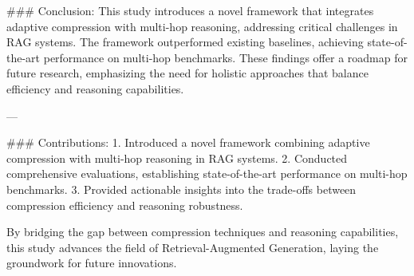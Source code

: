### Conclusion:
This study introduces a novel framework that integrates adaptive compression with multi-hop reasoning, addressing critical challenges in RAG systems. The framework outperformed existing baselines, achieving state-of-the-art performance on multi-hop benchmarks. These findings offer a roadmap for future research, emphasizing the need for holistic approaches that balance efficiency and reasoning capabilities.

---

### Contributions:
1. Introduced a novel framework combining adaptive compression with multi-hop reasoning in RAG systems.
2. Conducted comprehensive evaluations, establishing state-of-the-art performance on multi-hop benchmarks.
3. Provided actionable insights into the trade-offs between compression efficiency and reasoning robustness.

By bridging the gap between compression techniques and reasoning capabilities, this study advances the field of Retrieval-Augmented Generation, laying the groundwork for future innovations.